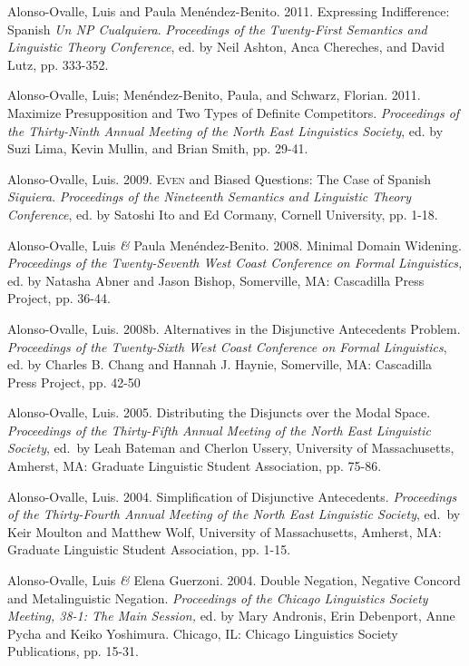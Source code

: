 \documentclass[11pt]{article}
\begin{document}
Alonso-Ovalle, Luis and Paula Men\'endez-Benito. 2011. Expressing Indifference: Spanish
\textit{Un {\em NP} Cualquiera}. \textit{Proceedings of the Twenty-First
  Semantics and Linguistic Theory Conference}, ed. by Neil Ashton,
Anca Chereches, and David Lutz, pp. 333-352. 

Alonso-Ovalle, Luis; Men\'endez-Benito, Paula, and Schwarz,
Florian. 2011. Maximize Presupposition and Two Types of Definite
Competitors. \textit{Proceedings of the Thirty-Ninth Annual Meeting of the North East Linguistics
  Society}, ed. by Suzi Lima, Kevin Mullin, and Brian
Smith, pp. 29-41. 


Alonso-Ovalle, Luis. 2009. \textsc{Even} and Biased Questions: The Case of Spanish \textit{Siquiera}. \textit{Proceedings of the Nineteenth Semantics and Linguistic Theory Conference}, ed. by Satoshi Ito and Ed Cormany, Cornell University, pp. 1-18.%


Alonso-Ovalle, Luis \textit{\&} Paula
    Men\'endez-Benito. 2008. Minimal Domain Widening. \textit{Proceedings of the Twenty-Seventh
    West Coast Conference on Formal Linguistics,} ed. by Natasha Abner
  and Jason Bishop,  Somerville, MA: Cascadilla Press Project,
  pp. 36-44.


Alonso-Ovalle, Luis. 2008b. Alternatives in the
  Disjunctive Antecedents Problem. \textit{Proceedings of the Twenty-Sixth
    West Coast Conference on Formal Linguistics}, ed. by Charles
  B. Chang and Hannah J. Haynie, Somerville, MA: Cascadilla Press Project, pp. 42-50


Alonso-Ovalle, Luis. 2005. Distributing the Disjuncts over the Modal Space. \textit{Proceedings of the Thirty-Fifth Annual Meeting of the North East Linguistic Society}, ed.\ by Leah Bateman and Cherlon Ussery,  University of Massachusetts, Amherst, MA: Graduate Linguistic Student Association, pp. 75-86. 

Alonso-Ovalle, Luis. 2004. Simplification of Disjunctive Antecedents. \textit{Proceedings of the Thirty-Fourth Annual Meeting of the North East Linguistic Society}, ed.\ by Keir Moulton and Matthew Wolf,  University of Massachusetts, Amherst, MA: Graduate Linguistic Student Association, pp. 1-15.


Alonso-Ovalle, Luis \textit{\&} Elena Guerzoni. 2004. Double Negation, Negative Concord and Metalinguistic Negation. \textit{Proceedings of the Chicago Linguistics Society Meeting, 38-1: The Main Session,} ed. by Mary Andronis, Erin Debenport, Anne Pycha and Keiko Yoshimura. Chicago, IL: Chicago Linguistics Society Publications, pp. 15-31.
\end{document}
